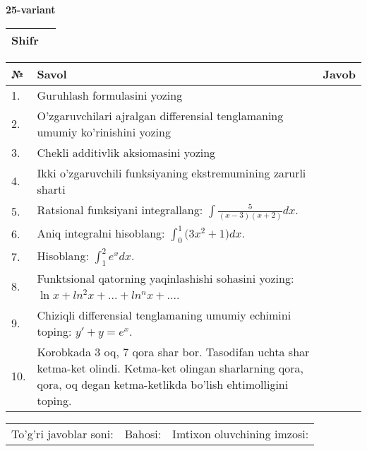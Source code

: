 \documentclass{article}
\begin{document}
  \egroup
  
  \newpage
  
  
  \textbf{25-variant}\\
  
  \bgroup
  \def\arraystretch{1.6} %
  
  \begin{tabular}{|m{5.7cm}|m{9.5cm}|}
  \hline
  Shifr & \\
  \hline
  \end{tabular}
  
  \vspace{1cm}
  
  \begin{tabular}{|m{0.7cm}|m{10cm}|m{4cm}|}
  \hline
  № & Savol & Javob \\
  \hline
  1. & Guruhlash formulasini yozing &  \\
  \hline
  2. & O'zgaruvchilari ajralgan differensial tenglamaning umumiy ko'rinishini yozing &  \\
  \hline
  3. & Chekli additivlik aksiomasini yozing &  \\
  \hline
  4. & Ikki o'zgaruvchili funksiyaning ekstremumining zarurli sharti &  \\
  \hline
  5. & Ratsional funksiyani integrallang: \(\int {\frac{5}{(x - 3)(x + 2)}dx}\). &  \\
  \hline
  6. & Aniq integralni hisoblang: \(\int_{0}^{1}{(3x^{2}} + 1)dx\). &  \\
  \hline
  7. & Hisoblang: \(\int_{1}^{2}{e^{x}dx}\). &  \\
  \hline
  8. & Funktsional qatorning yaqinlashishi sohasini yozing: \(\ln x + ln^{2}x + ... + ln^{n}x + ...\). &  \\
  \hline
  9. & Chiziqli differensial tenglamaning umumiy echimini toping: \(y' + y = e^{x}\). &  \\
  \hline
  10. & Korobkada 3 oq, 7 qora shar bor. Tasodifan uchta shar ketma-ket olindi. Ketma-ket olingan sharlarning qora, qora, oq degan ketma-ketlikda bo'lish ehtimolligini toping. &  \\
  \hline
  \end{tabular}
  
  \vspace{1cm}
  
  \begin{tabular}{lll}
  To'g'ri javoblar soni: \underline{\hspace{1.5cm}} & 
  Bahosi: \underline{\hspace{1.5cm}} & 
  Imtixon oluvchining imzosi: \underline{\hspace{2cm}} \\
  \end{tabular}
  
\end{document}
